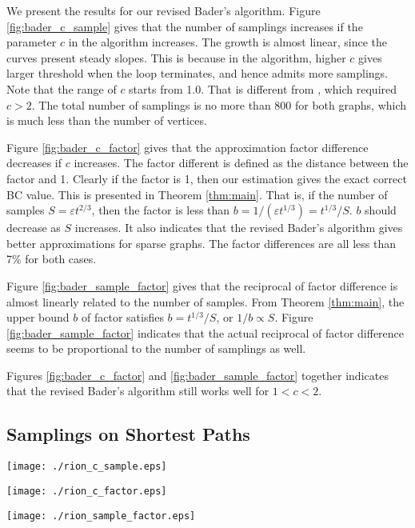 \documentclass[10pt]{article}
\begin{document}
We present the results for our revised Bader's algorithm. 
Figure \ref{fig:bader_c_sample} gives that the number of samplings increases if the parameter $c$ in the algorithm increases. The growth is almost linear, since the curves present steady slopes. This is because in the algorithm, higher $c$ gives larger threshold when the loop terminates, and hence admits more samplings. Note that the range of $c$ starts from 1.0. That is different from \cite{bader2007approximating}, which required $c>2$. The total number of samplings is no more than 800 for both graphs, which is much less than the number of vertices.

Figure \ref{fig:bader_c_factor} gives that the approximation factor difference decreases if $c$ increases. The factor different is defined as the distance between the factor and 1. Clearly if the factor is 1, then our estimation gives the exact correct BC value. This is presented in Theorem \ref{thm:main}. That is, if the number of samples $S=\varepsilon t^{2/3}$, then the factor is less than $b = 1/(\varepsilon t^{1/3}) = t^{1/3}/S$. $b$ should decrease as $S$ increases. It also indicates that the revised Bader's algorithm gives better approximations for sparse graphs. The factor differences are all less than 7\% for both cases.

Figure \ref{fig:bader_sample_factor} gives that the reciprocal of factor difference is almost linearly related to the number of samples. From Theorem \ref{thm:main}, the upper bound $b$ of factor satisfies $b = t^{1/3}/S$, or $1/b \propto S$. Figure \ref{fig:bader_sample_factor} indicates that the actual reciprocal of factor difference seems to be proportional to the number of samplings as well. 

Figures \ref{fig:bader_c_factor} and \ref{fig:bader_sample_factor} together indicates that the revised Bader's algorithm still works well for $1<c<2$.

\subsection{Samplings on Shortest Paths}

\begin{figure*}[!t]
\centering
\begin{minipage}[t]{0.3\textwidth}
\centering
\texttt{[image: ./rion\_c\_sample.eps]}
\caption{$c \sim \textrm{\# samples}$.}
\label{fig:rion_c_sample}
\end{minipage}
\hspace{10pt}
\begin{minipage}[t]{0.3\textwidth}
\centering
\texttt{[image: ./rion\_c\_factor.eps]}
\caption{$c \sim \textrm{factor diff}$.}
\label{fig:rion_c_factor}
\end{minipage}
\hspace{10pt}
\begin{minipage}[t]{0.3\textwidth}
\centering
\texttt{[image: ./rion\_sample\_factor.eps]}
\caption{$\textrm{\# samples} \sim 1/\textrm{factor diff}$}
\label{fig:rion_sample_factor}
\end{minipage}
\end{figure*}
\end{document}
